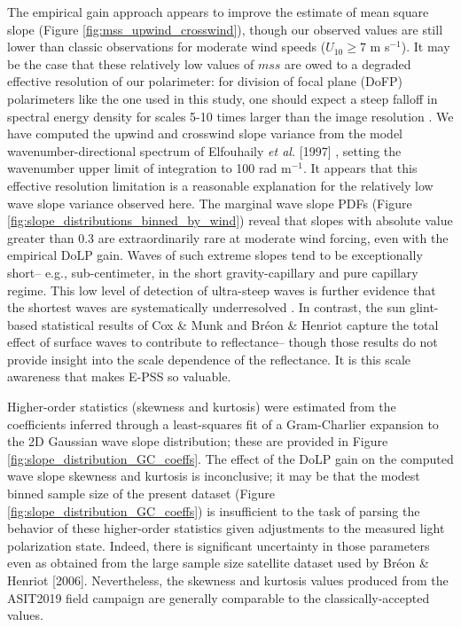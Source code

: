 \documentclass[letterpaper,journal]{IEEEtran}
\begin{document}
The empirical gain approach appears to improve the estimate of mean square slope (Figure \ref{fig:mss_upwind_crosswind}), though our observed values are still lower than classic observations \cite{Cox1954a,Breon2006} for moderate wind speeds ($U_{10}\geq7$ m s$^{-1}$). It may be the case that these relatively low values of $mss$ are owed to a degraded effective resolution of our polarimeter: for division of focal plane (DoFP) polarimeters like the one used in this study, one should expect a steep falloff in spectral energy density for scales 5-10 times larger than the image resolution \cite{laxague_effects_2025}. We have computed the upwind and crosswind slope variance from the model wavenumber-directional spectrum of Elfouhaily \emph{et al.} [1997] \cite{Elfouhaily1997}, setting the wavenumber upper limit of integration to 100 rad m$^{-1}$. It appears that this effective resolution limitation \cite{laxague_effects_2025} is a reasonable explanation for the relatively low wave slope variance observed here. The marginal wave slope PDFs (Figure \ref{fig:slope_distributions_binned_by_wind}) reveal that slopes with absolute value greater than 0.3 are extraordinarily rare at moderate wind forcing, even with the empirical DoLP gain. Waves of such extreme slopes tend to be exceptionally short-- e.g., sub-centimeter, in the short gravity-capillary and pure capillary regime. This low level of detection of ultra-steep waves is further evidence that the shortest waves are systematically underresolved \cite{laxague_effects_2025}. In contrast, the sun glint-based statistical results of Cox \& Munk and Br\'eon \& Henriot capture the total effect of surface waves to contribute to reflectance-- though those results do not provide insight into the scale dependence of the reflectance. It is this scale awareness that makes E-PSS so valuable.

Higher-order statistics (skewness and kurtosis) were estimated from the coefficients inferred through a least-squares fit of a Gram-Charlier expansion to the 2D Gaussian wave slope distribution; these are provided in Figure \ref{fig:slope_distribution_GC_coeffs}. The effect of the DoLP gain on the computed wave slope skewness and kurtosis is inconclusive; it may be that the modest binned sample size of the present dataset (Figure \ref{fig:slope_distribution_GC_coeffs}) is insufficient to the task of parsing the behavior of these higher-order statistics given adjustments to the measured light polarization state. Indeed, there is significant uncertainty in those parameters even as obtained from the large sample size satellite dataset used by Br\'eon \& Henriot [2006]. Nevertheless, the skewness and kurtosis values produced from the ASIT2019 field campaign are generally comparable to the classically-accepted values.
\end{document}

